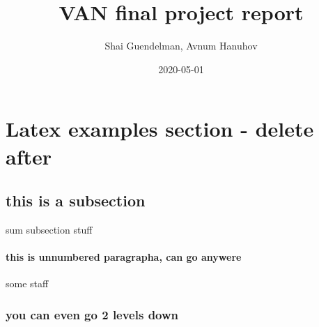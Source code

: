 \documentclass{article}
\title{VAN final project report}
\date{2020-05-01}
\author{Shai Guendelman, Avnum Hanuhov}
\begin{document}
	\maketitle
	\newpage
	
	\section{Latex examples section - delete after}
	\subsection{this is a subsection}
	sum subsection stuff 
	
	\paragraph{this is unnumbered paragrapha, can go anywere}
	some staff
	\subsubsection{you can even go 2 levels down}
\end{document}
